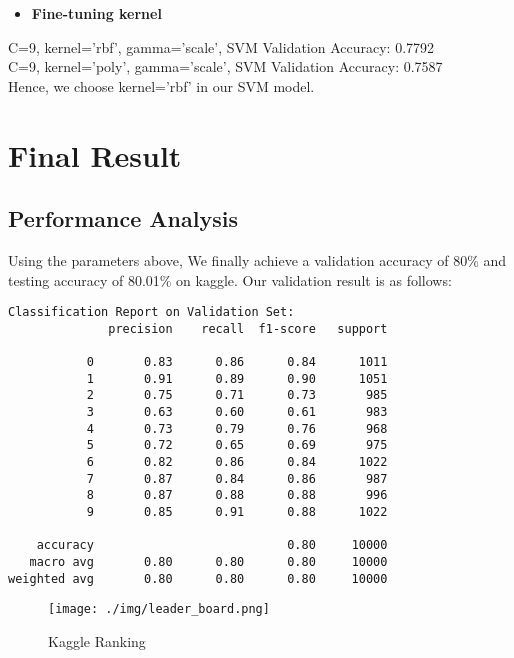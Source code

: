 \documentclass[a4paper,11pt]{article}
\begin{document}
\begin{itemize}
    \item \textbf{Fine-tuning kernel}
\end{itemize}
C=9, kernel='rbf', gamma='scale', SVM Validation Accuracy: 0.7792 \\
C=9, kernel='poly', gamma='scale', SVM Validation Accuracy: 0.7587 \\
Hence, we choose kernel='rbf' in our SVM model.

\section{Final Result}

\subsection{Performance Analysis}
Using the parameters above, 
We finally achieve a validation accuracy of 80\% and testing accuracy of 80.01\% on kaggle. Our validation result is as follows:
\begin{verbatim}
Classification Report on Validation Set:
              precision    recall  f1-score   support

           0       0.83      0.86      0.84      1011
           1       0.91      0.89      0.90      1051
           2       0.75      0.71      0.73       985
           3       0.63      0.60      0.61       983
           4       0.73      0.79      0.76       968
           5       0.72      0.65      0.69       975
           6       0.82      0.86      0.84      1022
           7       0.87      0.84      0.86       987
           8       0.87      0.88      0.88       996
           9       0.85      0.91      0.88      1022

    accuracy                           0.80     10000
   macro avg       0.80      0.80      0.80     10000
weighted avg       0.80      0.80      0.80     10000
\end{verbatim}

\begin{figure}
    \centering
    \texttt{[image: ./img/leader\_board.png]}
    \caption{Kaggle Ranking}
    \label{fig:enter-label}
\end{figure}
\end{document}
